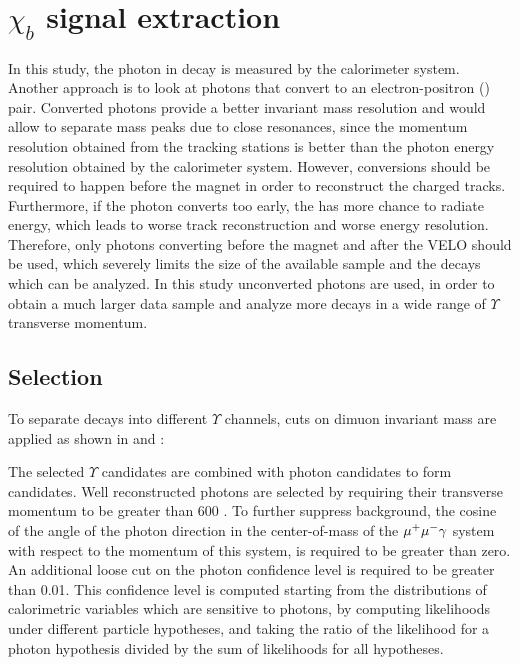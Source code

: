 \section{\texorpdfstring{$\chi_b$}{xb} signal extraction}
\label{sec:chib}

In this study, the photon in \chib decay is measured by the calorimeter system.
Another approach is to look at photons that convert to an electron-positron
(\epem) pair. Converted photons provide a better invariant mass resolution and would 
allow to separate mass peaks due to close resonances, since the 
\epm momentum 
resolution obtained from the tracking stations is better than the photon energy resolution obtained
by the calorimeter system. However, conversions should be required to happen before the magnet in
order to reconstruct the charged tracks. Furthermore, if the photon converts too
early, the \epm has more chance to radiate energy, which leads to worse
track reconstruction and worse energy resolution. Therefore, only photons
converting before the magnet and after the VELO should be used, which severely limits 
the size of the available sample and the decays which can be analyzed. In this study 
unconverted photons are used, in order to obtain a much larger data sample and 
analyze more decays in a wide range of $\Upsilon$ transverse momentum. 

\subsection{Selection}
\label{sec:chib:selection}

To separate decays into different $\Upsilon$ channels, cuts on dimuon invariant mass are 
applied as shown in  and :




The selected $\Upsilon$ candidates  are combined with photon candidates to form
\chib candidates. Well reconstructed photons are selected by requiring their 
transverse momentum to be greater than 600 \mevc. To further suppress background, 
the cosine of the angle of the photon direction in the center-of-mass of the
$\mu^+\mu^-\gamma$ system with respect to the momentum of this system, is required to
be greater than zero. An additional loose cut on the photon confidence level is
required to be greater than 0.01. This confidence level is computed starting from the distributions 
of calorimetric variables which are sensitive to photons, by computing likelihoods under different particle 
hypotheses, and taking   
the ratio of the likelihood for a photon hypothesis divided by the sum of likelihoods for all hypotheses. 

